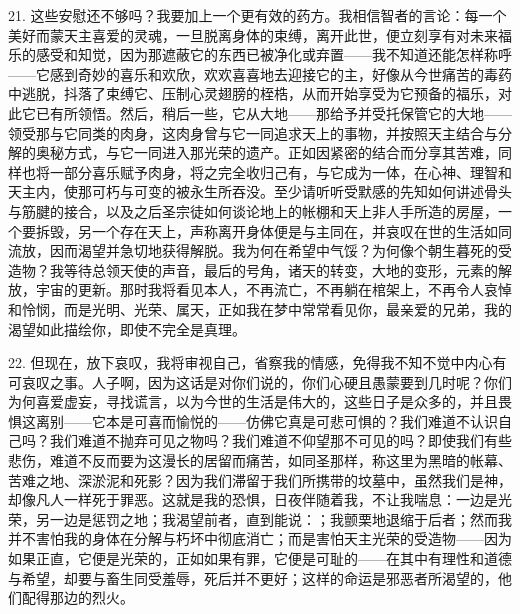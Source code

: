 21. 这些安慰还不够吗？我要加上一个更有效的药方。我相信智者的言论：每一个美好而蒙天主喜爱的灵魂，一旦脱离身体的束缚，离开此世，便立刻享有对未来福乐的感受和知觉，因为那遮蔽它的东西已被净化或弃置——我不知道还能怎样称呼——它感到奇妙的喜乐和欢欣，欢欢喜喜地去迎接它的主，好像从今世痛苦的毒药中逃脱，抖落了束缚它、压制心灵翅膀的桎梏，从而开始享受为它预备的福乐，对此它已有所领悟。然后，稍后一些，它从大地——那给予并受托保管它的大地——领受那与它同类的肉身，这肉身曾与它一同追求天上的事物，并按照天主结合与分解的奥秘方式，与它一同进入那光荣的遗产。正如因紧密的结合而分享其苦难，同样也将一部分喜乐赋予肉身，将之完全收归己有，与它成为一体，在心神、理智和天主内，使那可朽与可变的被永生所吞没。至少请听听受默感的先知如何讲述骨头与筋腱的接合，以及之后圣宗徒如何谈论地上的帐棚和天上非人手所造的房屋，一个要拆毁，另一个存在天上，声称离开身体便是与主同在，并哀叹在世的生活如同流放，因而渴望并急切地获得解脱。我为何在希望中气馁？为何像个朝生暮死的受造物？我等待总领天使的声音，最后的号角，诸天的转变，大地的变形，元素的解放，宇宙的更新。那时我将看见本人，不再流亡，不再躺在棺架上，不再令人哀悼和怜悯，而是光明、光荣、属天，正如我在梦中常常看见你，最亲爱的兄弟，我的渴望如此描绘你，即使不完全是真理。\par

22. 但现在，放下哀叹，我将审视自己，省察我的情感，免得我不知不觉中内心有可哀叹之事。人子啊，因为这话是对你们说的，你们心硬且愚蒙要到几时呢？你们为何喜爱虚妄，寻找谎言，以为今世的生活是伟大的，这些日子是众多的，并且畏惧这离别——它本是可喜而愉悦的——仿佛它真是可悲可惧的？我们难道不认识自己吗？我们难道不抛弃可见之物吗？我们难道不仰望那不可见的吗？即使我们有些悲伤，难道不反而要为这漫长的居留而痛苦，如同圣那样，称这里为黑暗的帐幕、苦难之地、深淤泥和死影？因为我们滞留于我们所携带的坟墓中，虽然我们是神，却像凡人一样死于罪恶。这就是我的恐惧，日夜伴随着我，不让我喘息：一边是光荣，另一边是惩罚之地；我渴望前者，直到能说：；我颤栗地退缩于后者；然而我并不害怕我的身体在分解与朽坏中彻底消亡；而是害怕天主光荣的受造物——因为如果正直，它便是光荣的，正如如果有罪，它便是可耻的——在其中有理性和道德与希望，却要与畜生同受羞辱，死后并不更好；这样的命运是邪恶者所渴望的，他们配得那边的烈火。\par

